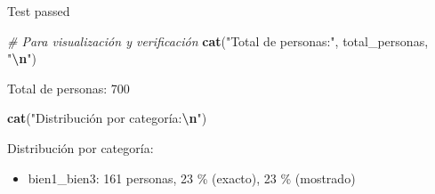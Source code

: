 \documentclass[
]{article}
\newenvironment{Shaded}{\begin{snugshade}}{\end{snugshade}}
\newcommand{\CommentTok}[1]{\textcolor[rgb]{0.56,0.35,0.01}{\textit{#1}}}
\newcommand{\FunctionTok}[1]{\textcolor[rgb]{0.13,0.29,0.53}{\textbf{#1}}}
\newcommand{\NormalTok}[1]{#1}
\newcommand{\SpecialCharTok}[1]{\textcolor[rgb]{0.81,0.36,0.00}{\textbf{#1}}}
\newcommand{\StringTok}[1]{\textcolor[rgb]{0.31,0.60,0.02}{#1}}
\providecommand{\tightlist}{%
  \setlength{\itemsep}{0pt}\setlength{\parskip}{0pt}}
\begin{document}
Test passed

\begin{Shaded}
\begin{Highlighting}[]
\CommentTok{\# Para visualización y verificación}
\FunctionTok{cat}\NormalTok{(}\StringTok{"Total de personas:"}\NormalTok{, total\_personas, }\StringTok{"}\SpecialCharTok{\textbackslash{}n}\StringTok{"}\NormalTok{)}
\end{Highlighting}
\end{Shaded}

Total de personas: 700

\begin{Shaded}
\begin{Highlighting}[]
\FunctionTok{cat}\NormalTok{(}\StringTok{"Distribución por categoría:}\SpecialCharTok{\textbackslash{}n}\StringTok{"}\NormalTok{)}
\end{Highlighting}
\end{Shaded}

Distribución por categoría:

\begin{Shaded}
\end{Shaded}

\begin{itemize}
\tightlist
\item
  bien1\_bien3: 161 personas, 23 \% (exacto), 23 \% (mostrado)
\end{itemize}

\begin{Shaded}
\end{Shaded}
\end{document}
